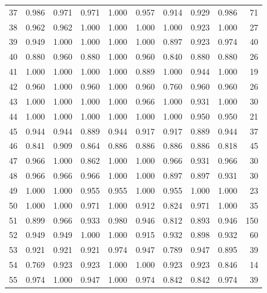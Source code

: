 \begin{table}[]
{\begin{tabular}{lrrrrrrrrr}
    37 &  0.986 & 0.971 & 0.971 &   1.000 &             0.957 & 0.914 & 0.929 & 0.986 &    71 \\
    38 &  0.962 & 0.962 & 1.000 &   1.000 &             1.000 & 1.000 & 0.923 & 1.000 &    27 \\
    39 &  0.949 & 1.000 & 1.000 &   1.000 &             1.000 & 0.897 & 0.923 & 0.974 &    40 \\
    40 &  0.880 & 0.960 & 0.880 &   1.000 &             0.960 & 0.840 & 0.880 & 0.880 &    26 \\
    41 &  1.000 & 1.000 & 1.000 &   1.000 &             0.889 & 1.000 & 0.944 & 1.000 &    19 \\
    42 &  0.960 & 1.000 & 0.960 &   1.000 &             0.960 & 0.760 & 0.960 & 0.960 &    26 \\
    43 &  1.000 & 1.000 & 1.000 &   1.000 &             0.966 & 1.000 & 0.931 & 1.000 &    30 \\
    44 &  1.000 & 1.000 & 1.000 &   1.000 &             1.000 & 1.000 & 0.950 & 0.950 &    21 \\
    45 &  0.944 & 0.944 & 0.889 &   0.944 &             0.917 & 0.917 & 0.889 & 0.944 &    37 \\
    46 &  0.841 & 0.909 & 0.864 &   0.886 &             0.886 & 0.886 & 0.886 & 0.818 &    45 \\
    47 &  0.966 & 1.000 & 0.862 &   1.000 &             1.000 & 0.966 & 0.931 & 0.966 &    30 \\
    48 &  0.966 & 0.966 & 0.966 &   1.000 &             1.000 & 0.897 & 0.897 & 0.931 &    30 \\
    49 &  1.000 & 1.000 & 0.955 &   0.955 &             1.000 & 0.955 & 1.000 & 1.000 &    23 \\
    50 &  1.000 & 1.000 & 0.971 &   1.000 &             0.912 & 0.824 & 0.971 & 1.000 &    35 \\
    51 &  0.899 & 0.966 & 0.933 &   0.980 &             0.946 & 0.812 & 0.893 & 0.946 &   150 \\
    52 &  0.949 & 0.949 & 1.000 &   1.000 &             0.915 & 0.932 & 0.898 & 0.932 &    60 \\
    53 &  0.921 & 0.921 & 0.921 &   0.974 &             0.947 & 0.789 & 0.947 & 0.895 &    39 \\
    54 &  0.769 & 0.923 & 0.923 &   1.000 &             1.000 & 0.923 & 0.923 & 0.846 &    14 \\
    55 &  0.974 & 1.000 & 0.947 &   1.000 &             0.974 & 0.842 & 0.842 & 0.974 &    39 \\

\end{tabular}}
\end{table}
